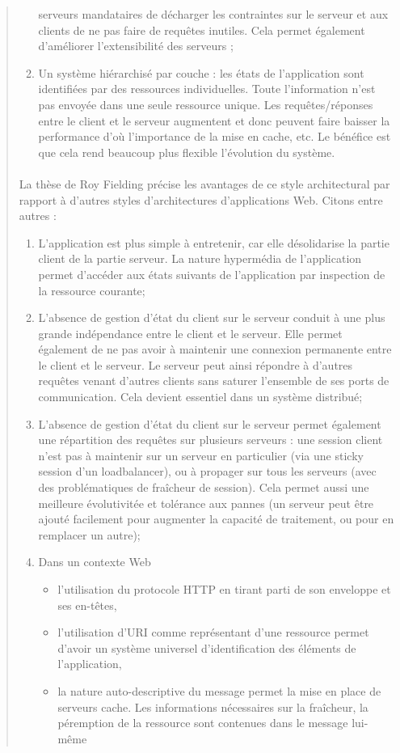 \documentclass{report}
\begin{document}
\begin{quotation}
\begin{enumerate}
serveurs mandataires de décharger les contraintes sur le serveur et aux clients de ne pas faire de requêtes inutiles. Cela
permet également d'améliorer l'extensibilité des serveurs ;
\item Un système hiérarchisé par couche : les états de l'application sont identifiées par des ressources individuelles. 
Toute l'information n'est pas envoyée dans une seule ressource unique. Les requêtes/réponses entre le client et le 
serveur augmentent et donc peuvent faire baisser la performance d'où l'importance de la mise en cache, etc. Le bénéfice
est que cela rend beaucoup plus flexible l'évolution du système.
\end{enumerate}

\paragraph{}
La thèse de Roy Fielding précise les avantages de ce style architectural par rapport à d’autres styles d’architectures 
d’applications Web. Citons entre autres :

\begin{enumerate}
\item L’application est plus simple à entretenir, car elle désolidarise la partie client de la partie serveur. La nature 
hypermédia de l'application permet d'accéder aux états suivants de l'application par inspection de la ressource courante;
\item L'absence de gestion d’état du client sur le serveur conduit à une plus grande indépendance entre le client et le 
serveur. Elle permet également de ne pas avoir à maintenir une connexion permanente entre le client et le serveur. 
Le serveur peut ainsi répondre à d'autres requêtes venant d'autres clients sans saturer l'ensemble de ses ports de 
communication. Cela devient essentiel dans un système distribué;
\item L’absence de gestion d’état du client sur le serveur permet également une répartition des requêtes sur plusieurs 
serveurs : une session client n’est pas à maintenir sur un serveur en particulier (via une sticky session d’un loadbalancer), ou à propager sur tous les serveurs (avec des problématiques de fraîcheur de session). Cela permet aussi une meilleure 
évolutivitée et tolérance aux pannes (un serveur peut être ajouté facilement pour augmenter la capacité de traitement, ou pour en remplacer un autre);
\item Dans un contexte Web
    \begin{itemize}
    \item l’utilisation du protocole HTTP en tirant parti de son enveloppe et ses en-têtes,
    \item l’utilisation d’URI comme représentant d’une ressource permet d'avoir un système universel d'identification des 
     éléments de l'application,
    \item la nature auto-descriptive du message permet la mise en place de serveurs cache. Les informations nécessaires
     sur la fraîcheur, la péremption de la ressource sont contenues dans le message lui-même
    \end{itemize}
\end{enumerate}
\end{quotation}
\end{document}
